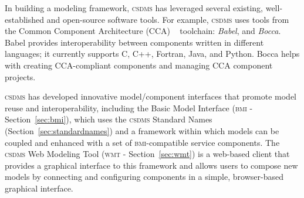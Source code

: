 \documentclass[11pt, oneside]{amsart}
\DeclareRobustCommand{\csdms}{\textsc{csdms}}
\DeclareRobustCommand{\bmi}{\textsc{bmi}}
\DeclareRobustCommand{\wmt}{\textsc{wmt}}
\begin{document}
In building a modeling framework, \csdms{} has leveraged
several existing, well-established and open-source software tools. For example,
\csdms{} uses tools from the Common Component Architecture (CCA)
~\cite{armstrong1999toward} toolchain: \emph{Babel}, and \emph{Bocca}. Babel
provides interoperability between components
written in different languages; it currently supports C, C++, Fortran, Java,
and Python. Bocca helps with creating CCA-compliant components and managing CCA
component projects.

\csdms{} has developed innovative model/component interfaces that promote
model reuse and interoperability,
including the Basic Model Interface (\bmi{} - Section~\ref{sec:bmi}), which
uses
the \csdms{} Standard Names (Section~\ref{sec:standardnames}) and a framework
within which models can be coupled and enhanced with a set of \bmi{}-compatible
service components.
The \csdms{} Web Modeling Tool (\wmt{} - Section~\ref{sec:wmt}) is a web-based client that provides a
graphical interface to this framework and allows users to compose new models
by connecting and configuring components in a simple, browser-based graphical
interface.
\end{document}
